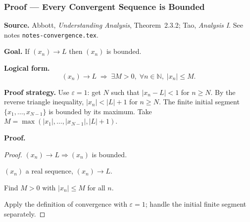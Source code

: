 
\clearpage
{}
\hypertarget{proof-RA-TAO-P-conv-bounded}{}

\subsubsection[Convergent Implies Bounded]{Proof --- Every Convergent Sequence is Bounded}

\bigskip

\noindent
\textbf{Source.}
Abbott, \emph{Understanding Analysis}, Theorem~2.3.2; Tao, \emph{Analysis I}.
See notes \texttt{notes-convergence.tex}.

\vspace{0.75em}

\noindent
\textbf{Goal.}
If $(x_n) \to L$ then $(x_n)$ is bounded.

\vspace{0.75em}

\noindent
\textbf{Logical form.}
\[
  (x_n) \to L
  \;\Rightarrow\;
  \exists M > 0,\; \forall n \in \mathbb{N},\; |x_n| \le M.
\]

\vspace{0.75em}

\noindent
\textbf{Proof strategy.}
Use $\varepsilon = 1$: get $N$ such that $|x_n - L| < 1$ for $n \ge N$.
By the reverse triangle inequality, $|x_n| < |L| + 1$ for $n \ge N$.
The finite initial segment $\{x_1, \ldots, x_{N-1}\}$ is bounded by its
maximum. Take $M = \max(|x_1|, \ldots, |x_{N-1}|, |L| + 1)$.

\vspace{0.75em}

\noindent
\textbf{Proof.}
\begin{proof}
\Claim $(x_n) \to L \Rightarrow (x_n)$ is bounded.

\Given $(x_n)$ a real sequence, $(x_n) \to L$.

\Goal Find $M > 0$ with $|x_n| \le M$ for all $n$.

\Strategy Apply the definition of convergence with $\varepsilon = 1$; handle
the initial finite segment separately.

\medskip





\end{proof}

